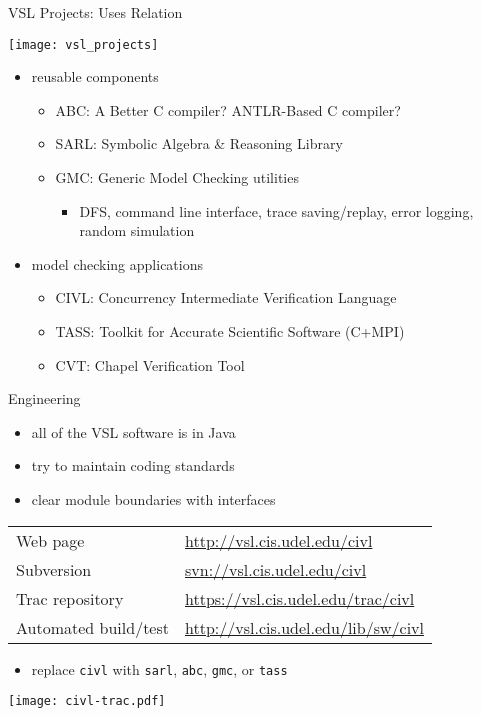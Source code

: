\documentclass[t]{beamer}
\begin{document}
\begin{frame}{VSL Projects: Uses Relation}

  \texttt{[image: vsl\_projects]}

  \begin{itemize}
  \item reusable components
    \begin{itemize}
    \item ABC: A Better C compiler?  ANTLR-Based C compiler?
    \item SARL: Symbolic Algebra \& Reasoning Library
    \item GMC: Generic Model Checking utilities
      \begin{itemize}
      \item DFS, command line interface, trace saving/replay, error
        logging, random simulation
      \end{itemize}
    \end{itemize}
  \item model checking applications
    \begin{itemize}
    \item CIVL: Concurrency Intermediate Verification Language
    \item TASS: Toolkit for Accurate Scientific Software (C+MPI)
    \item CVT: Chapel Verification Tool
    \end{itemize}
  \end{itemize}

\end{frame}

\begin{frame}{Engineering}

  \begin{itemize}
  \item all of the VSL software is in Java
  \item try to maintain coding standards
  \item clear module boundaries with interfaces
  \end{itemize}
  
  
  \begin{center}
    \begin{tabular}{|ll|}
      \hline
      Web page & \url{http://vsl.cis.udel.edu/civl}\\
      Subversion & \url{svn://vsl.cis.udel.edu/civl}\\
      Trac repository & \url{https://vsl.cis.udel.edu/trac/civl}\\
      Automated build/test & \url{http://vsl.cis.udel.edu/lib/sw/civl}\\
      \hline
    \end{tabular}
  \end{center}

  \begin{itemize}
  \item replace \texttt{civl} with \texttt{sarl}, \texttt{abc}, \texttt{gmc}, or
    \texttt{tass}
  \end{itemize}

  \texttt{[image: civl-trac.pdf]}
  
\end{frame}
\end{document}
